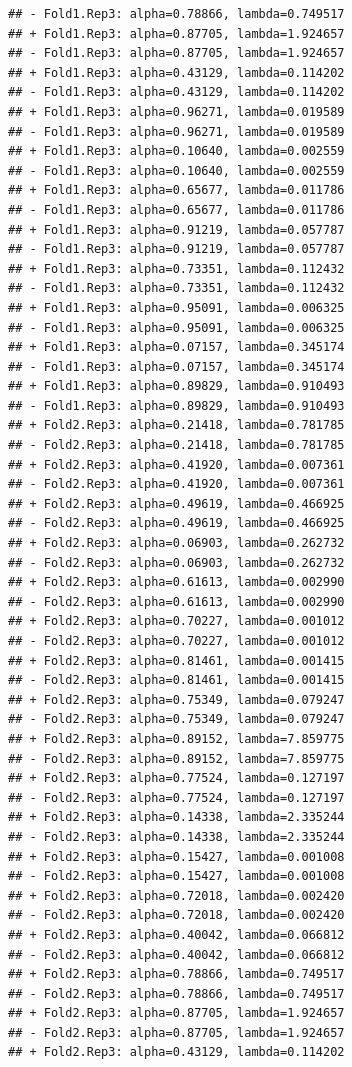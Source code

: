 \documentclass[
]{article}
\begin{document}
\begin{verbatim}
## - Fold1.Rep3: alpha=0.78866, lambda=0.749517 
## + Fold1.Rep3: alpha=0.87705, lambda=1.924657 
## - Fold1.Rep3: alpha=0.87705, lambda=1.924657 
## + Fold1.Rep3: alpha=0.43129, lambda=0.114202 
## - Fold1.Rep3: alpha=0.43129, lambda=0.114202 
## + Fold1.Rep3: alpha=0.96271, lambda=0.019589 
## - Fold1.Rep3: alpha=0.96271, lambda=0.019589 
## + Fold1.Rep3: alpha=0.10640, lambda=0.002559 
## - Fold1.Rep3: alpha=0.10640, lambda=0.002559 
## + Fold1.Rep3: alpha=0.65677, lambda=0.011786 
## - Fold1.Rep3: alpha=0.65677, lambda=0.011786 
## + Fold1.Rep3: alpha=0.91219, lambda=0.057787 
## - Fold1.Rep3: alpha=0.91219, lambda=0.057787 
## + Fold1.Rep3: alpha=0.73351, lambda=0.112432 
## - Fold1.Rep3: alpha=0.73351, lambda=0.112432 
## + Fold1.Rep3: alpha=0.95091, lambda=0.006325 
## - Fold1.Rep3: alpha=0.95091, lambda=0.006325 
## + Fold1.Rep3: alpha=0.07157, lambda=0.345174 
## - Fold1.Rep3: alpha=0.07157, lambda=0.345174 
## + Fold1.Rep3: alpha=0.89829, lambda=0.910493 
## - Fold1.Rep3: alpha=0.89829, lambda=0.910493 
## + Fold2.Rep3: alpha=0.21418, lambda=0.781785 
## - Fold2.Rep3: alpha=0.21418, lambda=0.781785 
## + Fold2.Rep3: alpha=0.41920, lambda=0.007361 
## - Fold2.Rep3: alpha=0.41920, lambda=0.007361 
## + Fold2.Rep3: alpha=0.49619, lambda=0.466925 
## - Fold2.Rep3: alpha=0.49619, lambda=0.466925 
## + Fold2.Rep3: alpha=0.06903, lambda=0.262732 
## - Fold2.Rep3: alpha=0.06903, lambda=0.262732 
## + Fold2.Rep3: alpha=0.61613, lambda=0.002990 
## - Fold2.Rep3: alpha=0.61613, lambda=0.002990 
## + Fold2.Rep3: alpha=0.70227, lambda=0.001012 
## - Fold2.Rep3: alpha=0.70227, lambda=0.001012 
## + Fold2.Rep3: alpha=0.81461, lambda=0.001415 
## - Fold2.Rep3: alpha=0.81461, lambda=0.001415 
## + Fold2.Rep3: alpha=0.75349, lambda=0.079247 
## - Fold2.Rep3: alpha=0.75349, lambda=0.079247 
## + Fold2.Rep3: alpha=0.89152, lambda=7.859775 
## - Fold2.Rep3: alpha=0.89152, lambda=7.859775 
## + Fold2.Rep3: alpha=0.77524, lambda=0.127197 
## - Fold2.Rep3: alpha=0.77524, lambda=0.127197 
## + Fold2.Rep3: alpha=0.14338, lambda=2.335244 
## - Fold2.Rep3: alpha=0.14338, lambda=2.335244 
## + Fold2.Rep3: alpha=0.15427, lambda=0.001008 
## - Fold2.Rep3: alpha=0.15427, lambda=0.001008 
## + Fold2.Rep3: alpha=0.72018, lambda=0.002420 
## - Fold2.Rep3: alpha=0.72018, lambda=0.002420 
## + Fold2.Rep3: alpha=0.40042, lambda=0.066812 
## - Fold2.Rep3: alpha=0.40042, lambda=0.066812 
## + Fold2.Rep3: alpha=0.78866, lambda=0.749517 
## - Fold2.Rep3: alpha=0.78866, lambda=0.749517 
## + Fold2.Rep3: alpha=0.87705, lambda=1.924657 
## - Fold2.Rep3: alpha=0.87705, lambda=1.924657 
## + Fold2.Rep3: alpha=0.43129, lambda=0.114202 

\end{verbatim}
\end{document}
